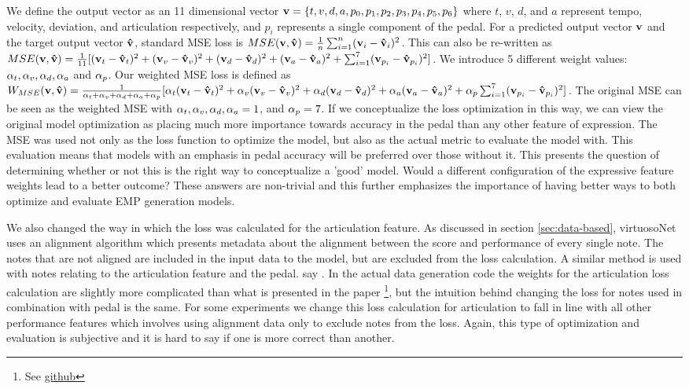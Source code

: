 We define the output vector as an 11 dimensional vector $\mathbf{v} = \{t, v, d, a, p_0, p_1, p_2, p_3, p_4, p_5, p_6\}$ where $t$, $v$, $d$, and $a$ represent tempo, velocity, deviation, and articulation respectively, and $p_i$ represents a single component of the pedal. For a predicted output vector $\mathbf{v}$ and the target output vector $\mathbf{\hat{v}}$, standard MSE loss is $MSE(\mathbf{v}, \mathbf{\hat{v}}) = \frac{1}{n}\sum_{i=1}^{n}(\mathbf{v}_i - \mathbf{\hat{v}}_i)^2$. This can also be re-written as $MSE(\mathbf{v}, \mathbf{\hat{v}}) = \frac{1}{11}[(\mathbf{v}_{t} - \mathbf{\hat{v}}_{t})^2 + (\mathbf{v}_{v} - \mathbf{\hat{v}}_{v})^2 + (\mathbf{v}_{d} - \mathbf{\hat{v}}_{d})^2 + (\mathbf{v}_{a} - \mathbf{\hat{v}}_{a})^2 + \sum_{i=1}^{7}(\mathbf{v}_{p_{i}} - \mathbf{\hat{v}}_{p_{i}})^2]$. We introduce 5 different weight values: $\alpha_{t}, \alpha_{v}, \alpha_{d}, \alpha_{a}$ and $\alpha_{p}$. Our weighted MSE loss is defined as $W_{MSE}(\mathbf{v}, \mathbf{\hat{v}}) = \frac{1}{\alpha_{t} + \alpha_{v} + \alpha_{d} + \alpha_{a} + \alpha_{p}}[\alpha_{t}(\mathbf{v}_{t} - \mathbf{\hat{v}}_{t})^2 + \alpha_{v}(\mathbf{v}_{v} - \mathbf{\hat{v}}_{v})^2 + \alpha_{d}(\mathbf{v}_{d} - \mathbf{\hat{v}}_{d})^2 + \alpha_{a}(\mathbf{v}_{a} - \mathbf{\hat{v}}_{a})^2 + \alpha_{p}\sum_{i=1}^{7}(\mathbf{v}_{p_{i}} - \mathbf{\hat{v}}_{p_{i}})^2 ]$. The original MSE can be seen as the weighted MSE with $\alpha_{t}, \alpha_{v}, \alpha_{d}, \alpha_{a} = 1$, and $\alpha_{p} = 7$. If we conceptualize the loss optimization in this way, we can view the original model optimization as placing much more importance towards accuracy in the pedal than any other feature of expression. The MSE was used not only as the loss function to optimize the model, but also as the actual metric to evaluate the model with. This evaluation means that models with an emphasis in pedal accuracy will be preferred over those without it. This presents the question of determining whether or not this is the right way to conceptualize a 'good' model. Would a different configuration of the expressive feature weights lead to a better outcome? These answers are non-trivial and this further emphasizes the importance of having better ways to both optimize and evaluate EMP generation models. 

We also changed the way in which the loss was calculated for the articulation feature. As discussed in section \ref{sec:data-based}, virtuosoNet uses an alignment algorithm which presents metadata about the alignment between the score and performance of every single note. The notes that are not aligned are included in the input data to the model, but are excluded from the loss calculation. A similar method is used with notes relating to the articulation feature and the pedal. \citet{jeong2019virtuosonet} say . In the actual data generation code the weights for the articulation loss calculation are slightly more complicated than what is presented in the paper \footnote{See \href{https://github.com/jdasam/pyScoreParser/blob/1d36e6f4f46d835f3ad08fea66892f475ac08dd9/xml_matching.py\#L323}{github}}, but the intuition behind changing the loss for notes used in combination with pedal is the same. For some experiments we change this loss calculation for articulation to fall in line with all other performance features which involves using alignment data only to exclude notes from the loss. Again, this type of optimization and evaluation is subjective and it is hard to say if one is more correct than another. 

